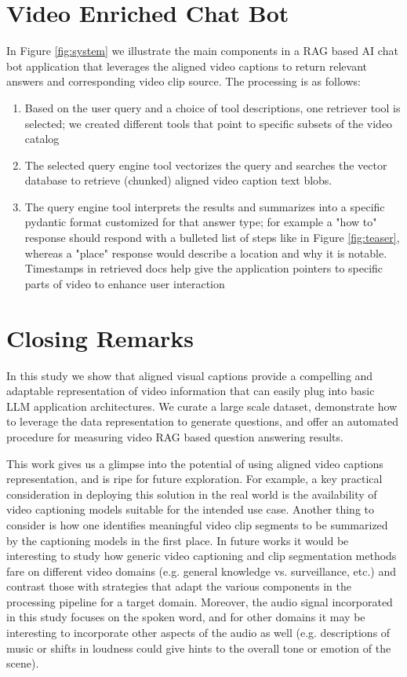 \documentclass[sigconf]{acmart}
\begin{document}
\begin{CCSXML}
		\section{Video Enriched Chat Bot}
		\label{sec:app}
		
		In Figure \ref{fig:system} we illustrate the main components in a RAG based AI chat bot application that leverages the aligned video captions to return relevant answers and corresponding video clip source. The processing is as follows:
		
		\begin{enumerate}
			\item Based on the user query and a choice of tool descriptions, one retriever tool is selected; we created different tools that point to specific subsets of the video catalog
			\item The selected query engine tool vectorizes the query and searches the vector database to retrieve (chunked) aligned video caption text blobs.
			\item The query engine tool interprets the results and summarizes into a specific pydantic format customized for that answer type; for example a "how to" response should respond with a bulleted list of steps like in Figure \ref{fig:teaser}, whereas a "place" response would describe a location and why it is notable. Timestamps in retrieved docs help give the application pointers to specific parts of video to enhance user interaction
		\end{enumerate}
		
		\section{Closing Remarks}
		\label{sec:closing}
		
		In this study we show that aligned visual captions provide a compelling and adaptable representation of video information that can easily plug into basic LLM application architectures. We curate a large scale dataset, demonstrate how to leverage the data representation to generate questions, and offer an automated procedure for measuring video RAG based question answering results.
		
		This work gives us a glimpse into the potential of using aligned video captions representation, and is ripe for future exploration. For example, a key practical consideration in deploying this solution in the real world is the availability of video captioning models suitable for the intended use case. Another thing to consider is how one identifies meaningful video clip segments to be summarized by the captioning models in the first place. In future works it would be interesting to study how generic video captioning and clip segmentation methods fare on different video domains (e.g. general knowledge vs. surveillance, etc.) and contrast those with strategies that adapt the various components in the processing pipeline for a target domain. Moreover, the audio signal incorporated in this study focuses on the spoken word, and for other domains it may be interesting to incorporate other aspects of the audio as well (e.g. descriptions of music or shifts in loudness could give hints to the overall tone or emotion of the scene).
		

\end{CCSXML}
\end{document}
